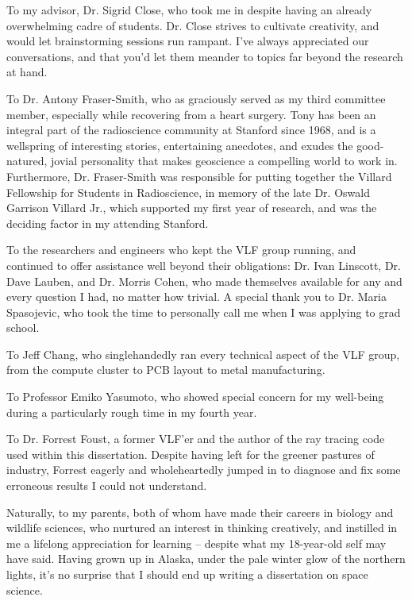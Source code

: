To my advisor, Dr. Sigrid Close, who took me in despite having an already overwhelming cadre of students. Dr. Close strives to cultivate creativity, and would let brainstorming sessions run rampant. I've always appreciated our conversations, and that you'd let them meander to topics far beyond the research at hand.

To Dr. Antony Fraser-Smith, who as graciously served as my third committee member, especially while recovering from a heart surgery. Tony has been an integral part of the radioscience community at Stanford since 1968, and is a wellspring of interesting stories, entertaining anecdotes, and exudes the good-natured, jovial personality that makes geoscience a compelling world to work in. Furthermore, Dr. Fraser-Smith was responsible for putting together the Villard Fellowship for Students in Radioscience, in memory of the late Dr. Oswald Garrison Villard Jr., which supported my first year of research, and was the deciding factor in my attending Stanford. 

To the researchers and engineers who kept the VLF group running, and continued to offer assistance well beyond their obligations: Dr. Ivan Linscott, Dr. Dave Lauben, and Dr. Morris Cohen, who made themselves available for any and every question I had, no matter how trivial. A special thank you to Dr. Maria Spasojevic, who took the time to personally call me when I was applying to grad school.
 
To Jeff Chang, who singlehandedly ran every technical aspect of the VLF group, from the compute cluster to PCB layout to metal manufacturing.
 
To Professor Emiko Yasumoto, who showed special concern for my well-being during a particularly rough time in my fourth year. 

To Dr. Forrest Foust, a former VLF'er and the author of the ray tracing code used within this dissertation. Despite having left for the greener pastures of industry, Forrest eagerly and wholeheartedly jumped in to diagnose and fix some erroneous results I could not understand.

Naturally, to my parents, both of whom have made their careers in biology and wildlife sciences, who nurtured an interest in thinking creatively, and instilled in me a lifelong appreciation for learning -- despite what my 18-year-old self may have said. Having grown up in Alaska, under the pale winter glow of the northern lights, it's no surprise that I should end up writing a dissertation on space science.

